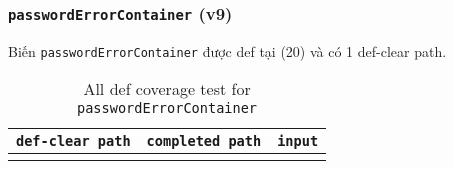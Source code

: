 \documentclass{article}
\begin{document}
\subsubsection*{\texttt{passwordErrorContainer} (v9)}

\par Biến \texttt{passwordErrorContainer} được def tại (20) và có 1 def-clear path.

\FloatBarrier
\begin{table}[htp]
    \centering
    \begin{tabular}{c|c|c}
        \texttt{def-clear path} & \texttt{completed path} & \texttt{input} \\
        \toprule
        \bottomrule
         &  &
    \end{tabular}
    \caption{All def coverage test for \texttt{passwordErrorContainer}}
\end{table}
\FloatBarrier
\end{document}
